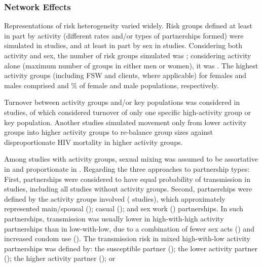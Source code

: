 \subsubsection{Network Effects}
\label{sss:res:network}
Representations of risk heterogeneity varied widely.
Risk groups defined at least in part by activity
(different rates and/or types of partnerships formed) were simulated in  studies,
and at least in part by sex in  studies.
Considering both activity and sex, the number of risk groups simulated was ;  %
considering activity alone (maximum number of groups in either men or women), it was .
The highest activity groups (including FSW and clients, where applicable) for females and males comprised
 and  \% of female and male populations, respectively.
\par
Turnover between activity groups and/or key populations %
was considered in  studies,
of which  considered turnover of only
one specific high-activity group or key population.
Another  studies simulated
movement only from lower activity groups into higher activity groups
to re-balance group sizes against disproportionate HIV mortality in higher activity groups.
\par
Among  studies with activity groups, sexual mixing was assumed to be
assortative in  and proportionate in .  %
Regarding the three approaches to partnership types:
First, partnerships were considered to have equal probability of transmission in
 studies, including all studies without activity groups.
Second, partnerships were defined by the activity groups involved ( studies),
which approximately represented
main/spousal ();
casual (); and
sex work () partnerships.
In such partnerships, transmission was usually
lower in high-with-high activity partnerships than in low-with-low, due to a combination of
fewer sex acts () and
increased condom use ().
The transmission risk in mixed high-with-low activity partnerships was defined by:
the susceptible partner ();
the lower activity partner ();
the higher activity partner (); or
